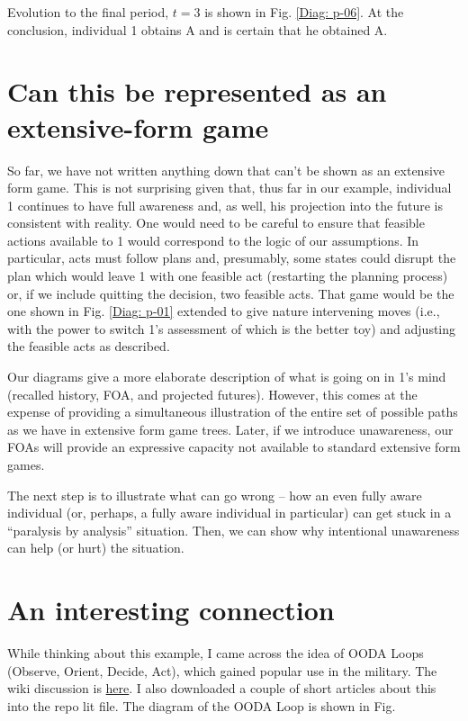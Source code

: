 \documentclass[
11pt,
titlepage,
reqno,
]{article}%
\theoremstyle{definition}
\begin{document}
Evolution to the final period, $t=3$ is shown in Fig. \ref{Diag: p-06}. At the conclusion, individual 1 obtains A and is certain that he obtained A. 

\section*{Can this be represented as an extensive-form game}

So far, we have not written anything down that can't be shown as an extensive form game. This is not surprising given that, thus far in our example, individual 1 continues to have full awareness and, as well, his projection into the future is consistent with reality. One would need to be careful to ensure that feasible actions available to 1 would correspond to the logic of our assumptions. In particular, acts must follow plans and, presumably, some states could disrupt the plan which would leave 1 with one feasible act (restarting the planning process) or, if we include quitting the decision, two feasible acts. That game would be the one shown in Fig. \ref{Diag: p-01} extended to give nature intervening moves (i.e., with the power to switch 1's assessment of which is the better toy) and adjusting the feasible acts as described.

Our diagrams give a more elaborate description of what is going on in 1's mind (recalled history, FOA, and projected futures). However, this comes at the expense of providing a simultaneous illustration of the entire set of possible paths as we have in extensive form game trees. Later, if we introduce unawareness, our FOAs will provide an expressive capacity not available to standard extensive form games. 

The next step is to illustrate what can go wrong -- how an even fully aware individual (or, perhaps, a fully aware individual in particular) can get stuck in a ``paralysis by analysis'' situation. Then, we can show why intentional unawareness can help (or hurt) the situation.


\section*{An interesting connection}
While thinking about this example, I came across the idea of OODA Loops (Observe, Orient, Decide, Act), which gained popular use in the military. The wiki discussion is \href{https://en.wikipedia.org/wiki/OODA_loop}{here}. I also downloaded a couple of short articles about this into the repo lit file. The diagram of the OODA Loop  is shown in Fig. 
\end{document}
